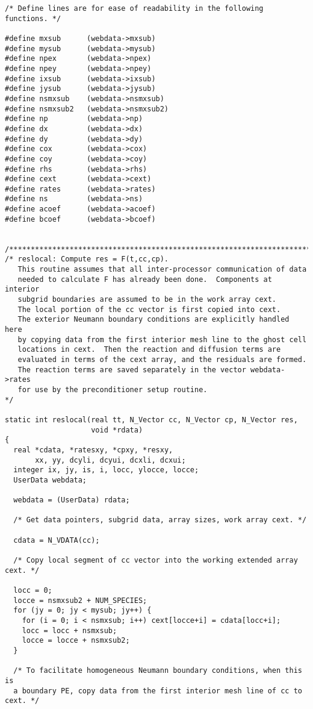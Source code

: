 \begin{verbatim}
/* Define lines are for ease of readability in the following functions. */

#define mxsub      (webdata->mxsub)
#define mysub      (webdata->mysub)
#define npex       (webdata->npex)
#define npey       (webdata->npey)
#define ixsub      (webdata->ixsub)
#define jysub      (webdata->jysub)
#define nsmxsub    (webdata->nsmxsub)
#define nsmxsub2   (webdata->nsmxsub2)
#define np         (webdata->np)
#define dx         (webdata->dx)
#define dy         (webdata->dy)
#define cox        (webdata->cox)
#define coy        (webdata->coy)
#define rhs        (webdata->rhs)
#define cext       (webdata->cext)
#define rates      (webdata->rates)
#define ns         (webdata->ns)
#define acoef      (webdata->acoef)
#define bcoef      (webdata->bcoef)


/*************************************************************************/
/* reslocal: Compute res = F(t,cc,cp).
   This routine assumes that all inter-processor communication of data
   needed to calculate F has already been done.  Components at interior
   subgrid boundaries are assumed to be in the work array cext.
   The local portion of the cc vector is first copied into cext.
   The exterior Neumann boundary conditions are explicitly handled here
   by copying data from the first interior mesh line to the ghost cell
   locations in cext.  Then the reaction and diffusion terms are
   evaluated in terms of the cext array, and the residuals are formed.
   The reaction terms are saved separately in the vector webdata->rates
   for use by the preconditioner setup routine.                          */

static int reslocal(real tt, N_Vector cc, N_Vector cp, N_Vector res,
                    void *rdata)
{
  real *cdata, *ratesxy, *cpxy, *resxy,
       xx, yy, dcyli, dcyui, dcxli, dcxui;
  integer ix, jy, is, i, locc, ylocce, locce;
  UserData webdata;

  webdata = (UserData) rdata;
  
  /* Get data pointers, subgrid data, array sizes, work array cext. */

  cdata = N_VDATA(cc);

  /* Copy local segment of cc vector into the working extended array cext. */

  locc = 0;
  locce = nsmxsub2 + NUM_SPECIES;
  for (jy = 0; jy < mysub; jy++) {
    for (i = 0; i < nsmxsub; i++) cext[locce+i] = cdata[locc+i];
    locc = locc + nsmxsub;
    locce = locce + nsmxsub2;
  }

  /* To facilitate homogeneous Neumann boundary conditions, when this is
  a boundary PE, copy data from the first interior mesh line of cc to cext. */


\end{verbatim}
